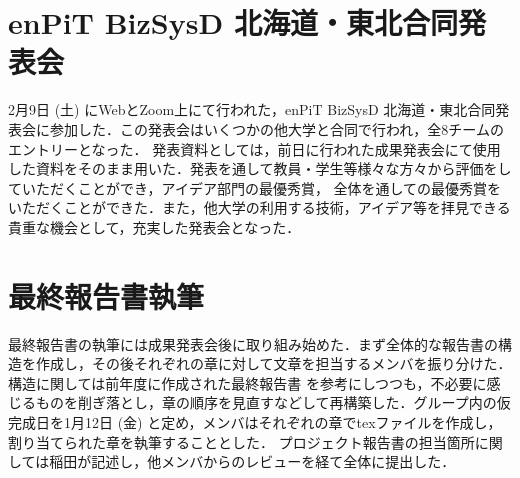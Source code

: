 \section{enPiT BizSysD 北海道・東北合同発表会}
2月9日 (土) にWebとZoom上にて行われた，enPiT BizSysD 北海道・東北合同発表会に参加した．この発表会はいくつかの他大学と合同で行われ，全8チームのエントリーとなった．
発表資料としては，前日に行われた成果発表会にて使用した資料をそのまま用いた．発表を通して教員・学生等様々な方々から評価をしていただくことができ，アイデア部門の最優秀賞，
全体を通しての最優秀賞をいただくことができた．また，他大学の利用する技術，アイデア等を拝見できる貴重な機会として，充実した発表会となった．

\section{最終報告書執筆}
最終報告書の執筆には成果発表会後に取り組み始めた．まず全体的な報告書の構造を作成し，その後それぞれの章に対して文章を担当するメンバを振り分けた．構造に関しては前年度に作成された最終報告書
を参考にしつつも，不必要に感じるものを削ぎ落とし，章の順序を見直すなどして再構築した．グループ内の仮完成日を1月12日 (金) と定め，メンバはそれぞれの章でtexファイルを作成し，割り当てられた章を執筆することとした．
プロジェクト報告書の担当箇所に関しては稲田が記述し，他メンバからのレビューを経て全体に提出した．
